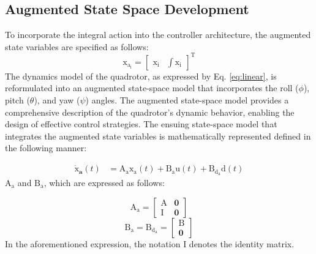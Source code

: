 \documentclass[3p,times]{elsarticle}
\begin{document}
\subsection{Augmented State Space Development}
\noindent To incorporate the integral action into the controller architecture, the augmented state variables are specified as follows:
\begin{equation}\label{lqidg_x}
    \boldsymbol{\mathrm{x_{a_i}}} = \begin{bmatrix}
        \boldsymbol{\mathrm{x_i}} &
        \displaystyle \int \boldsymbol{\mathrm{x_i}}
    \end{bmatrix}^\mathrm{T}
\end{equation}
The dynamics model of the quadrotor, as expressed by Eq. \eqref{eq:linear}, is reformulated into an augmented state-space model that incorporates the roll ($\phi$), pitch ($\theta$), and yaw ($\psi$) angles. The augmented state-space model provides a comprehensive description of the quadrotor's dynamic behavior, enabling the design of effective control strategies. The ensuing state-space model that integrates the augmented state variables is mathematically represented defined in the following manner:

\begin{equation}\label{systemlqidg}
	\begin{split}
		\boldsymbol{\dot{\mathrm{x}}_a}(t) &= \boldsymbol{\mathrm{A_ax_a}}(t) + \boldsymbol{\mathrm{B_{{a}}u}}(t) + \boldsymbol{\mathrm{B_{{d_a}}d}}(t)%
	\end{split}
\end{equation}
$\boldsymbol{\mathrm{A_a}}$ and $\boldsymbol{\mathrm{B_a}}$, which are expressed as follows:

\begin{equation}
	\boldsymbol{\mathrm{A_a}} = \begin{bmatrix}
		\boldsymbol{\mathrm{A}} & \boldsymbol{0}\\
		\boldsymbol{\mathrm{I}} & \boldsymbol{0}
	\end{bmatrix}
\end{equation}
\begin{equation}
	\boldsymbol{\mathrm{B_a}} = \boldsymbol{\mathrm{B_{{d_a}}}} = \begin{bmatrix}
		\boldsymbol{\mathrm{B}}\\
		\boldsymbol{0}
	\end{bmatrix}
\end{equation}
In the aforementioned expression, the notation $\boldsymbol{\mathrm{I}}$ denotes the identity matrix.
\end{document}
